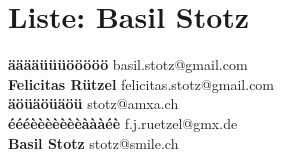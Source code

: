 \documentclass{scrartcl}
\begin{document}
\section*{Liste: Basil Stotz}
\textbf{ääääüüüööööö } basil.stotz@gmail.com\\
\textbf{Felicitas Rützel  } felicitas.stotz@gmail.com\\
\textbf{äöüäöüäöü } stotz@amxa.ch\\
\textbf{éééèèèèèèèàààéè } f.j.ruetzel@gmx.de\\
\textbf{Basil Stotz } stotz@smile.ch\\
\end{document}
